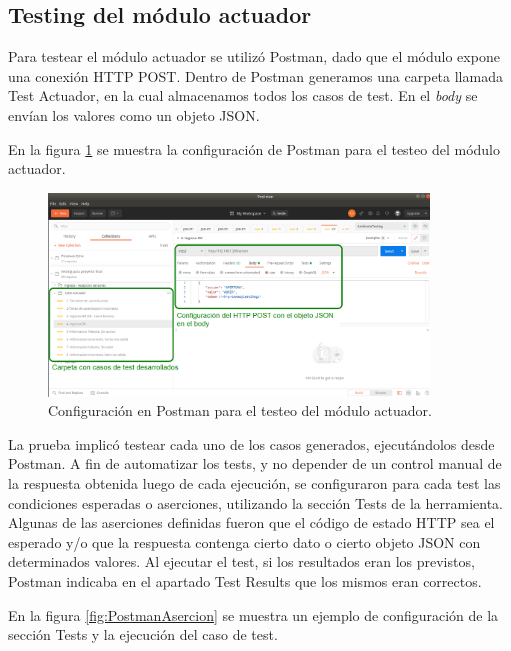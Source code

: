 \subsection{Testing del módulo actuador}

Para testear el módulo actuador se utilizó Postman, dado que el módulo expone una conexión HTTP POST. Dentro de Postman generamos una carpeta llamada Test Actuador, en la cual almacenamos todos los casos de test. En el \textit{body} se envían los valores como un objeto JSON.

En la figura \ref{fig:TestActuadorConfig} se muestra la configuración de Postman para el testeo del módulo actuador.

\begin{figure}[ht]
	\centering
	\includegraphics[width=0.9\textwidth]{./Figures/TestActuadorConfig.png}
	\caption{Configuración en Postman para el testeo del módulo actuador.}
	\label{fig:TestActuadorConfig}
\end{figure}

La prueba implicó testear cada uno de los casos generados, ejecutándolos desde Postman. A fin de automatizar los tests, y no depender de un control manual de la respuesta obtenida luego de cada ejecución, se configuraron para cada test las condiciones esperadas o aserciones, utilizando la sección Tests de la herramienta. Algunas de las aserciones definidas fueron que el código de estado HTTP sea el esperado y/o que la respuesta contenga cierto dato o cierto objeto JSON con determinados valores. Al ejecutar el test, si los resultados eran los previstos, Postman indicaba en el apartado Test Results que los mismos eran correctos.

En la figura \ref{fig:PostmanAsercion} se muestra un ejemplo de configuración de la sección Tests y la ejecución del caso de test.

